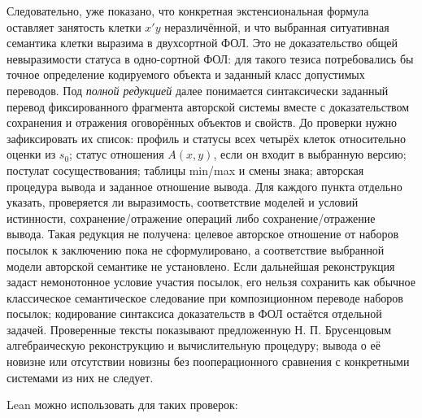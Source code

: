 \documentclass[12pt,a4paper]{article}
\begin{document}
Следовательно, уже показано, что конкретная экстенсиональная формула оставляет занятость клетки \(x'y\) неразличённой, и что выбранная ситуативная семантика клетки выразима в двухсортной ФОЛ. Это не доказательство общей невыразимости статуса в одно-сортной ФОЛ: для такого тезиса потребовались бы точное определение кодируемого объекта и заданный класс допустимых переводов. Под \emph{полной редукцией} далее понимается синтаксически заданный перевод фиксированного фрагмента авторской системы вместе с доказательством сохранения и отражения оговорённых объектов и свойств. До проверки нужно зафиксировать их список: профиль и статусы всех четырёх клеток относительно оценки из \(s_0\); статус отношения \(A(x,y)\), если он входит в выбранную версию; постулат сосуществования; таблицы min/max и смены знака; авторская процедура вывода и заданное отношение вывода. Для каждого пункта отдельно указать, проверяется ли выразимость, соответствие моделей и условий истинности, сохранение/отражение операций либо сохранение/отражение вывода. Такая редукция не получена: целевое авторское отношение от наборов посылок к заключению пока не сформулировано, а соответствие выбранной модели авторской семантике не установлено. Если дальнейшая реконструкция задаст немонотонное условие участия посылок, его нельзя сохранить как обычное классическое семантическое следование при композиционном переводе наборов посылок; кодирование синтаксиса доказательств в ФОЛ остаётся отдельной задачей. Проверенные тексты показывают предложенную Н. П. Брусенцовым алгебраическую реконструкцию и вычислительную процедуру; вывода о её новизне или отсутствии новизны без пооперационного сравнения с конкретными системами из них не следует.

Lean можно использовать для таких проверок:
\end{document}
